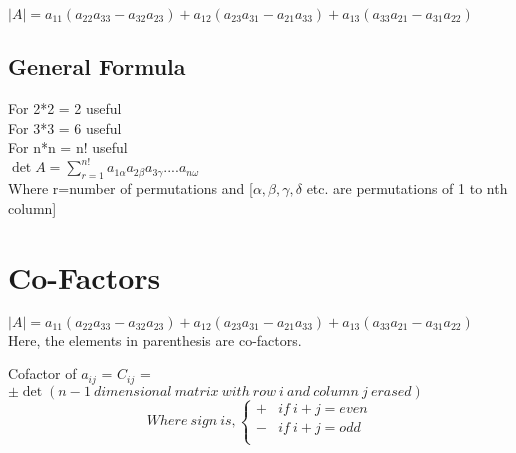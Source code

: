 \documentclass[]{article}
\begin{document}
	\noindent
	$\mid A \mid = a_{11}(a_{22}a_{33}-a_{32}a_{23}) + a_{12}(a_{23}a_{31}-a_{21}a_{33}) + a_{13}(a_{33}a_{21}-a_{31}a_{22})$\\
	
	\vspace{10pt}
	
	\subsection{General Formula}
	\vspace{10pt}
	
	\noindent
	For 2*2 = 2 useful\\
	For 3*3 = 6 useful\\
	For n*n = n! useful\\
	
	\noindent
	$\det{A} = \sum_{r=1}^{n!} a_{1\alpha}a_{2\beta}a_{3\gamma}....a_{n\omega}$\\
	
	\noindent
	Where r=number of permutations and [$\alpha , \beta , \gamma, \delta$ etc. are permutations of 1 to nth column]\\
	
	\vspace{10pt}
	
	\section{Co-Factors}
	
	\vspace{10pt}
	
		$\mid A \mid = a_{11}(a_{22}a_{33}-a_{32}a_{23}) + a_{12}(a_{23}a_{31}-a_{21}a_{33}) + a_{13}(a_{33}a_{21}-a_{31}a_{22})$\\
		
	\noindent
	Here, the elements in parenthesis are co-factors.
	
	\begin{mytheorem}[title = General formula for co-factor]
		Cofactor of $a_{ij}$ = $C_{ij}$ = $\pm \det{(n-1 \ dimensional \ matrix \ with \ row \ i \ and \ column \ j \ erased)}$\\
			
			\[ 
		Where \ sign \ is,
		\begin{cases} 
			+ & if \ i+j=even\\
			- & if \ i+j=odd \\ 
		\end{cases}
		\]\\

	\end{mytheorem}
\end{document}

